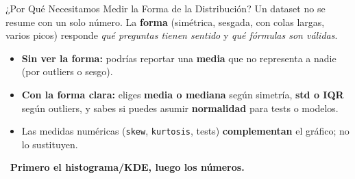 \documentclass[aspectratio=169, 11pt]{beamer}
\begin{document}
\begin{frame}[shrink=5]{¿Por Qué Necesitamos Medir la Forma de la Distribución?}
  \vspace{-4pt}
  {\footnotesize
    Un dataset no se resume con un solo número. La \textbf{forma} (simétrica, sesgada, con colas largas, varios picos)
    responde \textit{qué preguntas tienen sentido} y \textit{qué fórmulas son válidas}.}

  \vspace{6pt}
  {\scriptsize
  \begin{itemize}\setlength{\itemsep}{4pt}
    \item[{\color{arcaRed}\scriptsize\faArrowRight}]
      \textbf{Sin ver la forma:} podrías reportar una \textbf{media} que no representa a nadie (por outliers o sesgo).
    \item[{\color{arcaRed}\scriptsize\faArrowRight}]
      \textbf{Con la forma clara:} eliges \textbf{media o mediana} según simetría, \textbf{std o IQR} según outliers,
      y sabes si puedes asumir \textbf{normalidad} para tests o modelos.
    \item[{\color{arcaRed}\scriptsize\faArrowRight}]
      Las medidas numéricas (\texttt{skew}, \texttt{kurtosis}, tests) \textbf{complementan} el gráfico; no lo sustituyen.
  \end{itemize}
  }

  \vspace{6pt}
  \begin{center}
  \end{center}

  \vspace{4pt}
  {\scriptsize\color{textMuted}
    \faArrowRight\ \textbf{Primero el histograma/KDE, luego los números.}}
\end{frame}
\end{document}
